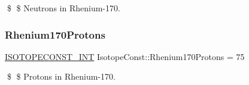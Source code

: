 \$ \$ Neutrons in Rhenium-\/170. \mbox{\label{group___isotope_const-_rhenium-_re170_ga7737328f2749ddc8b212ba6fa25aa5ce}} 
\subsubsection{\texorpdfstring{Rhenium170\+Protons}{Rhenium170Protons}}
{\footnotesize\ttfamily \mbox{\hyperlink{group___isotope_const-_macros_ga5f18360b3e99483a35c32d789e62621c}{I\+S\+O\+T\+O\+P\+E\+C\+O\+N\+S\+T\+\_\+\+I\+NT}} Isotope\+Const\+::\+Rhenium170\+Protons = 75}

\$ \$ Protons in Rhenium-\/170. 